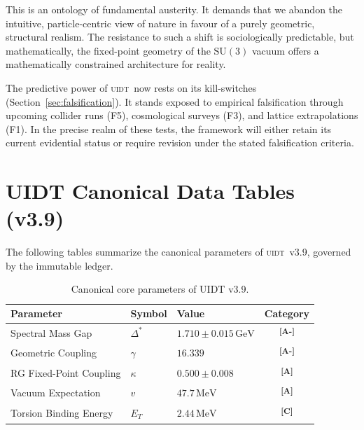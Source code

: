 \documentclass[12pt,a4paper,twoside]{article}
\theoremstyle{plain}
\theoremstyle{definition}
\theoremstyle{remark}
\newcommand{\UIDT}{\textsc{uidt}}
\newcommand{\GeV}{\,\mathrm{GeV}}
\newcommand{\MeV}{\,\mathrm{MeV}}
\newcommand{\catmark}[1]{\textsuperscript{\textsf{\textbf{[#1]}}}}
\newcommand{\DeltaGap}{1.710 \pm 0.015\GeV}        %
\newcommand{\kappaVal}{0.500}                      %
\newcommand{\GammaGeom}{16.339}                     %
\newcommand{\vVEV}{47.7\MeV}                        %
\newcommand{\ETorsion}{2.44\MeV}                    %
\begin{document}
This is an ontology of fundamental austerity. It demands that we abandon the
intuitive, particle-centric view of nature in favour of a purely geometric,
structural realism. The resistance to such a shift is sociologically
predictable, but mathematically, the fixed-point geometry of the $\mathrm{SU}(3)$
vacuum offers a mathematically constrained architecture for reality.

The predictive power of \UIDT\ now rests on its kill-switches
(Section~\ref{sec:falsification}). It stands exposed to empirical falsification
through upcoming collider runs (F5), cosmological surveys (F3), and lattice
extrapolations (F1). In the precise realm of these tests, the framework will
either retain its current evidential status or require revision under the
stated falsification criteria.

\newpage

\section{UIDT Canonical Data Tables (v3.9)}
\label{sec:data}

The following tables summarize the canonical parameters of \UIDT\ v3.9,
governed by the immutable ledger.

\begin{table}[H]
\centering
\caption{Canonical core parameters of UIDT v3.9.}
\label{tab:core}
\begin{tabular}{lllc}
\toprule
\textbf{Parameter} & \textbf{Symbol} & \textbf{Value} & \textbf{Category} \\
\midrule
Spectral Mass Gap & $\Delta^*$ & $\DeltaGap$ & \catmark{A-} \\
Geometric Coupling & $\gamma$ & $\GammaGeom$ & \catmark{A-} \\
RG Fixed-Point Coupling & $\kappa$ & $\kappaVal \pm 0.008$ & \catmark{A} \\
Vacuum Expectation & $v$ & $\vVEV$ & \catmark{A} \\
Torsion Binding Energy & $E_T$ & $\ETorsion$ & \catmark{C} \\
\bottomrule
\end{tabular}
\end{table}
\end{document}
